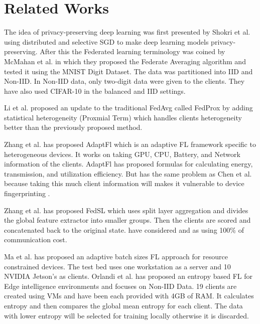 \documentclass[conference]{IEEEtran}
\begin{document}
\section{Related Works}
The idea of privacy-preserving deep learning was first presented by Shokri et al. \cite{shokri2015privacy} using distributed and selective SGD to make deep learning models privacy-preserving. After this the Federated learning terminology was coined by McMahan et al. \cite{mcmahan2017communication} in which they proposed the Federate Averaging algorithm and tested it using the MNIST Digit Dataset. The data was partitioned into IID and Non-IID. In Non-IID data, only two-digit data were given to the clients. They have also used CIFAR-10 in the balanced and IID settings. 
 \par 
Li et al. \cite{li2020federated} proposed an update to the traditional FedAvg called FedProx by adding statistical heterogeneity (Proxmial Term) which handles clients heterogeneity better than the previously proposed method.\par Zhang et al. \cite{zhang2024adaptfl} has proposed AdaptFl which is an adaptive FL framework specific to heterogeneous devices. It works on taking GPU, CPU, Battery, and Network information of the clients. AdaptFl has proposed formulas for calculating energy, transmission, and utilization efficiency. But has the same problem as Chen et al. \cite{chen2023boosting} because taking this much client information will makes it vulnerable to device fingerprinting . \par
Zhang et al. \cite{zhang2024fedsl} has proposed FedSL which uses split layer aggregation and divides the global feature extractor into smaller groups. Then the clients are scored and concatenated back to the original state. \cite{zhang2024fedsl} have considered \cite{mcmahan2017communication} and \cite{li2020federated} as using 100\% of communication cost. \par
Ma et al. \cite{ma2021adaptive} has proposed an adaptive batch sizes FL approach for resource constrained devices. The test bed uses one workstation as a server and 10 NVIDIA Jetson's as clients. Orlandi et al. \cite{orlandi2023entropy} has proposed an entropy based FL for Edge intelligence environments and focuses on Non-IID Data. 19 clients are created using VMs and have been each provided with 4GB of RAM. It calculates entropy and then compares the global mean entropy for each client. The data with lower entropy will be selected for training locally otherwise it is discarded. \par 
\end{document}
